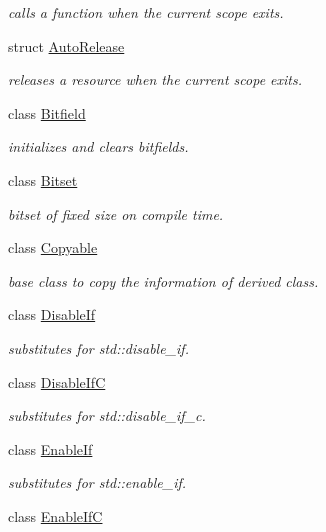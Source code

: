 \begin{DoxyCompactItemize}
\begin{DoxyCompactList}\small\item\em calls a function when the current scope exits. \end{DoxyCompactList}\item 
struct \hyperlink{structhryky_1_1_auto_release}{Auto\-Release}
\begin{DoxyCompactList}\small\item\em releases a resource when the current scope exits. \end{DoxyCompactList}\item 
class \hyperlink{classhryky_1_1_bitfield}{Bitfield}
\begin{DoxyCompactList}\small\item\em initializes and clears bitfields. \end{DoxyCompactList}\item 
class \hyperlink{classhryky_1_1_bitset}{Bitset}
\begin{DoxyCompactList}\small\item\em bitset of fixed size on compile time. \end{DoxyCompactList}\item 
class \hyperlink{classhryky_1_1_copyable}{Copyable}
\begin{DoxyCompactList}\small\item\em base class to copy the information of derived class. \end{DoxyCompactList}\item 
class \hyperlink{classhryky_1_1_disable_if}{Disable\-If}
\begin{DoxyCompactList}\small\item\em substitutes for std\-::disable\-\_\-if. \end{DoxyCompactList}\item 
class \hyperlink{classhryky_1_1_disable_if_c}{Disable\-If\-C}
\begin{DoxyCompactList}\small\item\em substitutes for std\-::disable\-\_\-if\-\_\-c. \end{DoxyCompactList}\item 
class \hyperlink{classhryky_1_1_enable_if}{Enable\-If}
\begin{DoxyCompactList}\small\item\em substitutes for std\-::enable\-\_\-if. \end{DoxyCompactList}\item 
class \hyperlink{classhryky_1_1_enable_if_c}{Enable\-If\-C}

\end{DoxyCompactItemize}
